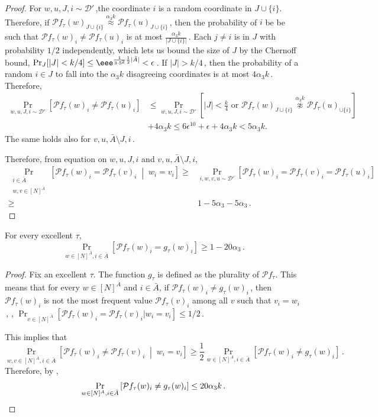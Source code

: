\documentclass{toc}
\newcommand{\Prob}[2][]{\Pr_{{#1}}\left[#2\right]} %
\newcommand{\brac}[1]{[#1]} %
\newcommand{\abs}[1]{\lvert#1\rvert} %
\newcommand{\given}{\;\middle\vert\;} %
\newcommand{\set}[1]{\{#1\}} %
\newcommand\f{f} %
\newcommand{\g}{g} %
\newcommand\bh{\mathcal{P}\f_\tau} %
\newcommand\neql[1]{\stackrel{{#1}}{ \approx}} %
\newcommand\neqg[1]{\stackrel{{#1}}{ \not\approx}} %
\newcommand\rest[1]{{\bar{#1}}}  %
\begin{document}
\begin{proof}
	For $w,u,J,i\sim\mathcal{D}'$\,,the coordinate $i$ is a random coordinate in $J\cup \set{i}$. Therefore, if $\bh(w)_{J\cup\set{i}} \neql{\alpha_3 k} \bh(u)_{J\cup\set{i}}$\,, then the probability of $i$ be be such that $\bh(w)_{i} \neq \bh(u)_{i}$ is at most $\frac{\alpha_3 k}{\abs{J\cup\set{i}}}$\,. 
	Each $j\neq i$ is in $J$ with probability 
	$1/2$ %
	independently, which lets us bound the size of $J$ by
the  %
Chernoff bound, $\Pr_J[\abs{J}<
	 k/4 %
	 ]\leq \eee^{\frac{1}{3\cdot 5^2}\frac{1}{2}\abs{\rest{A}}}< \epsilon$\,. If $\abs{J}>
	 k/4$\,, %
	then the probability of a random $i\in J$ to fall into the $\alpha_3 k$ disagreeing coordinates is at most $4\alpha_3 k$\,.
	Therefore,
	\begin{align}
	\Prob[w,u,J,i\sim\mathcal{D}']{\bh(w)_{i} \neq\bh(u)_{i}} &\leq \Prob[w,u,J,i\sim\mathcal{D}']{\abs{J}<\frac{k}{4} \textrm{ or }\bh(w)_{J\cup\set{i}} \neqg{\alpha_3 k} \bh(u)_{\cup\set{i}}} \nonumber\\
	&+ 4\alpha_3 k  \leq 6\epsilon^{10}+\epsilon+4\alpha_3 k < 5\alpha_3 k.\label{eq:i from J}
	\end{align}
	The same holds also for $v,u,\rest{A}\setminus J,i$\,.
	
	Therefore, from equation  on  $w,u,J,i$ and $v,u,\rest{A}\setminus J,i$,
	\begin{align*}
	\Prob[\substack{i\in\rest{A}\\w,v\in\brac{N}^{\rest{A}}}]{\bh(w)_i=\bh(v)_i\given w_i=v_i} \geq&  \Prob[i,w,v,u\sim\mathcal{D}']{\bh(w)_i=\bh(v)_i = \bh(u)_i} \\
	\geq& 1- 5\alpha_3 - 5\alpha_3\,.%
	\end{align*}
\end{proof}


\begin{claim} \label{claim:local avg product i}
	For every excellent $\tau$,
	\[ \Prob[w\in\brac{N}^{\bar{A}},i\in{\bar{A}}]{ \bh(w)_i = \g_\tau(w)_i}\geq 1-20\alpha_3\,.\]
\end{claim}

\begin{proof}
	Fix an excellent $\tau$. The function $\g_\tau$ is defined as the plurality of $\bh$. This means that for every $w\in[N]^{\rest{A}}$ and $i\in\rest{A}$, if $\bh(w)_i \neq \g_\tau(w)_i$\,, then $\bh(w)_i$ is not the most frequent value $\bh(v)_i$ among all $v $ such that $v_i=w_i$\,, \ie,
	 $\Pr_{v\in[N]^{\bar{A}}}[\bh(w)_i = \bh(v)_i | w_i=v_i]\leq 
	1/2$\,. %
	
	This implies that
	\[ \Prob[w,v\in\brac{N}^{\bar{A}},i\in\bar{A}]{\bh(w)_i \neq \bh(v)_i \given w_i=v_i} \geq \frac{1}{2}\Prob[w\in\brac{N}^{A},i\in\bar{A}]{ \bh(w)_i \neq \g_\tau(w)_i}\,.\,\]%
	Therefore, by , 
	\[\Prob[w\in\brac{N}^{A},i\in\bar{A}]{ \bh(w)_i \neq \g_\tau(w)_i}\leq 20\alpha_3 k\,. \qedhere \]  %
\end{proof}
\end{document}
